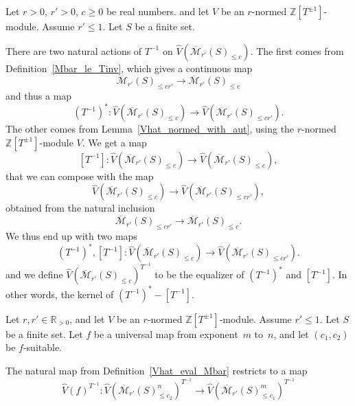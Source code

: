 \begin{definition}
  \label{Vhat_Mbar_Tinv}
  \leanok
  Let $r > 0$, $r' > 0$, $c \ge 0$ be real numbers.
  and let $V$ be an $r$-normed $\mathbb Z[T^{\pm 1}]$-module.
  Assume $r' \le 1$.
  Let $S$ be a finite set.

  There are two natural actions of $T^{-1}$ on
  $\hat V(\overline{\mathcal M}_{r'}(S)_{\le c})$.
  The first comes from Definition~\ref{Mbar_le_Tinv},
  which gives a continuous map
  \[
    \overline{\mathcal M}_{r'}(S)_{\le cr'} \to
    \overline{\mathcal M}_{r'}(S)_{\le c}
  \]
  and thus a map
  \[
    (T^{-1})^* \colon
    \hat V(\overline{\mathcal M}_{r'}(S)_{\le c}) \to
    \hat V(\overline{\mathcal M}_{r'}(S)_{\le cr'}).
  \]
  The other comes from Lemma~\ref{Vhat_normed_with_aut},
  using the $r$-normed $\mathbb Z[T^{\pm 1}]$-module $V$.
  We get a map
  \[
    [T^{-1}] \colon
    \hat V(\overline{\mathcal M}_{r'}(S)_{\le c}) \to
    \hat V(\overline{\mathcal M}_{r'}(S)_{\le c}),
  \]
  that we can compose with the map
  \[
    \hat V(\overline{\mathcal M}_{r'}(S)_{\le c}) \to
    \hat V(\overline{\mathcal M}_{r'}(S)_{\le cr'}),
  \]
  obtained from the natural inclusion
  \[
    \overline{\mathcal M}_{r'}(S)_{\le cr'} \to
    \overline{\mathcal M}_{r'}(S)_{\le c}.
  \]
  We thus end up with two maps
  \[
    (T^{-1})^*, [T^{-1}] \colon
    \hat V(\overline{\mathcal M}_{r'}(S)_{\le c}) \to
    \hat V(\overline{\mathcal M}_{r'}(S)_{\le cr'}).
  \]
  and we define
  $\hat V(\overline{\mathcal M}_{r'}(S)_{\le c})^{T^{-1}}$
  to be the equalizer of $(T^{-1})^*$ and $[T^{-1}]$.
  In other words, the kernel of $(T^{-1})^* - [T^{-1}]$.
\end{definition}

\begin{definition}
  \label{Vhat_eval_Mbar_Tinv}
  \leanok
  Let $r, r' \in \mathbb R_{>0}$,
  and let $V$ be an $r$-normed $\mathbb Z[T^{\pm 1}]$-module.
  Assume $r' \le 1$.
  Let $S$ be a finite set.
  Let $f$ be a universal map from exponent~$m$ to~$n$,
  and let $(c_1, c_2)$ be $f$-suitable.

  The natural map from Definition~\ref{Vhat_eval_Mbar}
  restricts to a map
  \[
    \hat V(f)^{T^{-1}} \colon
    \hat V(\overline{\mathcal M}_{r'}(S)_{\le c_2}^n)^{T^{-1}} \to
    \hat V(\overline{\mathcal M}_{r'}(S)_{\le c_1}^m)^{T^{-1}}
  \]
\end{definition}

